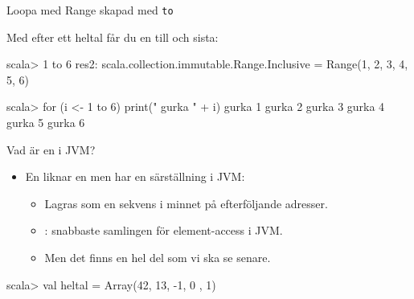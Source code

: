 \begin{Slide}{Loopa med Range skapad med \texttt{to}}

Med  efter ett heltal får du en  till och  sista:
\begin{REPLnonum}
scala> 1 to 6
res2: scala.collection.immutable.Range.Inclusive =
  Range(1, 2, 3, 4, 5, 6)

scala> for (i <- 1 to 6) print(" gurka " + i)
 gurka 1 gurka 2 gurka 3 gurka 4 gurka 5 gurka 6

\end{REPLnonum}


\end{Slide}



\begin{Slide}{Vad är en  i JVM?}


\begin{itemize}
\item En  liknar en  men har en särställning i JVM:
\begin{itemize}
\item Lagras som en sekvens i minnet på efterföljande adresser.
\item {}: snabbaste samlingen för element-access i JVM.
\item Men det finns en hel del  som vi ska se senare.
\end{itemize}

\end{itemize}

\begin{REPLnonum}
scala> val heltal = Array(42, 13, -1, 0 , 1)
\end{REPLnonum}

\end{Slide}

